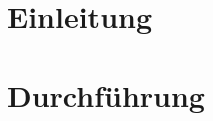 \documentclass[a4paper, 12pt]{article}
\begin{document}
\thispagestyle{empty}
\newpage
\thispagestyle{empty}
\tableofcontents
\newpage

\pagestyle{fancy}
\setcounter{page}{1}

\section{Einleitung}

%
%
\section{Durchführung}


%
%

%
%
\end{document}
